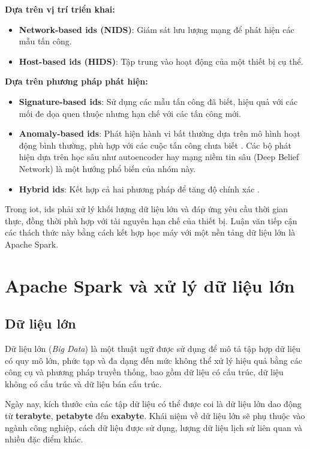 \textbf{Dựa trên vị trí triển khai:}
\begin{itemize}
  \item \textbf{Network-based \ac{ids} (NIDS)}: Giám sát lưu lượng mạng để phát hiện các mẫu tấn công.
  \item \textbf{Host-based \ac{ids} (HIDS)}: Tập trung vào hoạt động của một thiết bị cụ thể.
\end{itemize}

\vspace{1em}

\textbf{Dựa trên phương pháp phát hiện:}
\begin{itemize}
  \item \textbf{Signature-based \ac{ids}}: Sử dụng các mẫu tấn công đã biết, hiệu quả với các mối đe dọa quen thuộc nhưng hạn chế với các tấn công mới.
  \item \textbf{Anomaly-based \ac{ids}}: Phát hiện hành vi bất thường dựa trên mô hình hoạt động bình thường, phù hợp với các cuộc tấn công chưa biết \cite{chandola2009anomaly,ruff2021unifying}. Các bộ phát hiện dựa trên học sâu như autoencoder \cite{lopez2017autoencoder} hay mạng niềm tin sâu (Deep Belief Network) \cite{alrawashdeh2016toward} là một hướng phổ biến của nhóm này.
  \item \textbf{Hybrid \ac{ids}}: Kết hợp cả hai phương pháp để tăng độ chính xác \cite{Liao2013}.
\end{itemize}

Trong \ac{iot}, \ac{ids} phải xử lý khối lượng dữ liệu lớn và đáp ứng yêu cầu thời gian thực, đồng thời phù hợp với tài nguyên hạn chế của thiết bị. Luận văn tiếp cận các thách thức này bằng cách kết hợp học máy với một nền tảng dữ liệu lớn là Apache Spark.

\section{Apache Spark và xử lý dữ liệu lớn}
\subsection{Dữ liệu lớn}
Dữ liệu lớn (\textit{Big Data}) là một thuật ngữ được sử dụng để mô tả tập hợp dữ liệu có quy mô lớn, phức tạp và đa dạng đến mức không thể xử lý hiệu quả bằng các công cụ và phương pháp truyền thống, bao gồm dữ liệu có cấu trúc, dữ liệu không có cấu trúc và dữ liệu bán cấu trúc.

Ngày nay, kích thước của các tập dữ liệu có thể được coi là dữ liệu lớn dao động từ \textbf{terabyte}, \textbf{petabyte} đến \textbf{exabyte}. Khái niệm về dữ liệu lớn sẽ phụ thuộc vào ngành công nghiệp, cách dữ liệu được sử dụng, lượng dữ liệu lịch sử liên quan và nhiều đặc điểm khác.

